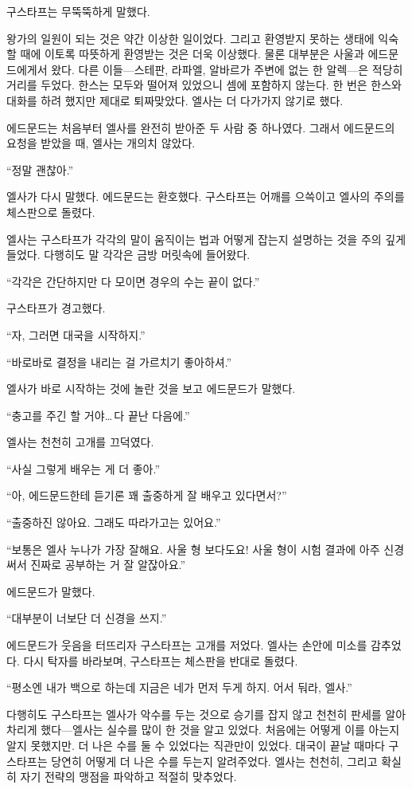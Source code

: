 구스타프는 무뚝뚝하게 말했다.

왕가의 일원이 되는 것은 약간 이상한 일이었다. 그리고 환영받지 못하는 생태에 익숙할 때에 이토록 따뜻하게 환영받는 것은 더욱 이상했다. 물론 대부분은 사울과 에드문드에게서 왔다. 다른 이들—스테판, 라파엘, 알바르가 주변에 없는 한 알렉—은 적당히 거리를 두었다. 한스는 모두와 떨어져 있었으니 셈에 포함하지 않는다. 한 번은 한스와 대화를 하려 했지만 제대로 퇴짜맞았다. 엘사는 더 다가가지 않기로 했다.

에드문드는 처음부터 엘사를 완전히 받아준 두 사람 중 하나였다. 그래서 에드문드의 요청을 받았을 때, 엘사는 개의치 않았다.

``정말 괜찮아.''

엘사가 다시 말했다. 에드문드는 환호했다. 구스타프는 어깨를 으쓱이고 엘사의 주의를 체스판으로 돌렸다.

엘사는 구스타프가 각각의 말이 움직이는 법과 어떻게 잡는지 설명하는 것을 주의 깊게 들었다. 다행히도 말 각각은 금방 머릿속에 들어왔다.

``각각은 간단하지만 다 모이면 경우의 수는 끝이 없다.''

구스타프가 경고했다.

``자, 그러면 대국을 시작하지.''

``바로바로 결정을 내리는 걸 가르치기 좋아하셔.''

엘사가 바로 시작하는 것에 놀란 것을 보고 에드문드가 말했다.

``충고를 주긴 할 거야\ldots\,다 끝난 다음에.''

엘사는 천천히 고개를 끄덕였다.

``사실 그렇게 배우는 게 더 좋아.''

``아, 에드문드한테 듣기론 꽤 출중하게 잘 배우고 있다면서?''

``출중하진 않아요. 그래도 따라가고는 있어요.''

``보통은 엘사 누나가 가장 잘해요. 사울 형 보다도요! 사울 형이 시험 결과에 아주 신경 써서 진짜로 공부하는 거 잘 알잖아요.''

에드문드가 말했다.

``대부분이 너보단 더 신경을 쓰지.''

에드문드가 웃음을 터뜨리자 구스타프는 고개를 저었다. 엘사는 손안에 미소를 감추었다. 다시 탁자를 바라보며, 구스타프는 체스판을 반대로 돌렸다.

``평소엔 내가 백으로 하는데 지금은 네가 먼저 두게 하지. 어서 둬라, 엘사.''

다행히도 구스타프는 엘사가 악수를 두는 것으로 승기를 잡지 않고 천천히 판세를 알아차리게 했다—엘사는 실수를 많이 한 것을 알고 있었다. 처음에는 어떻게 이를 아는지 알지 못했지만. 더 나은 수를 둘 수 있었다는 직관만이 있었다. 대국이 끝날 때마다 구스타프는 당연히 어떻게 더 나은 수를 두는지 알려주었다. 엘사는 천천히, 그리고 확실히 자기 전략의 맹점을 파악하고 적절히 맞추었다.

